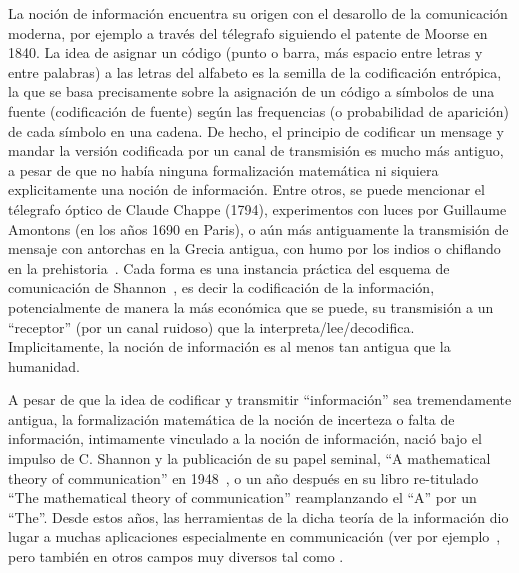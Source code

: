 \label{s:SZ:Introduccion}

La  noci\'on  de  informaci\'on encuentra  su  origen  con  el desarollo  de  la
comunicaci\'on  moderna, por  ejemplo a  trav\'es del  t\'elegrafo  siguiendo el
patente de Moorse en 1840. La idea  de asignar un c\'odigo (punto o barra, m\'as
espacio entre letras  y entre palabras) a las letras del  alfabeto es la semilla
de  la  codificaci\'on  entr\'opica,  la  que  se  basa  precisamente  sobre  la
asignaci\'on  de un  c\'odigo  a  s\'imbolos de  una  fuente (codificaci\'on  de
fuente)  seg\'un  las  frequencias  (o  probabilidad  de  aparici\'on)  de  cada
s\'imbolo  en una  cadena.  De  hecho, el  principio de  codificar un  mensage y
mandar  la versi\'on codificada  por un  canal de  transmisi\'on es  mucho m\'as
antiguo,  a pesar  de que  no  hab\'ia ninguna  formalizaci\'on matem\'atica  ni
siquiera explicitamente  una noci\'on de  informaci\'on.  Entre otros,  se puede
mencionar  el t\'elegrafo  \'optico de  Claude Chappe  (1794),  experimentos con
luces  por Guillaume  Amontons (en  los  a\~nos 1690  en Paris),  o a\'un  m\'as
antiguamente la transmisi\'on de mensaje con antorchas en la Grecia antigua, con
humo por los  indios o chiflando en la  prehistoria~\cite{Mon08}.  Cada forma es
una instancia  pr\'actica del esquema de  comunicaci\'on de Shannon~\cite{Sha48,
ShaWea64},  es decir la  codificaci\'on de  la informaci\'on,  potencialmente de
manera la  m\'as econ\'omica  que se puede,  su transmisi\'on a  un ``receptor''
(por  un canal  ruidoso) que  la interpreta/lee/decodifica.   Implicitamente, la
noci\'on de informaci\'on es al menos tan antigua que la humanidad.

A  pesar  de  que  la  idea  de codificar  y  transmitir  ``informaci\'on''  sea
tremendamente  antigua,  la  formalizaci\'on  matem\'atica  de  la  noci\'on  de
incerteza  o falta  de informaci\'on,  intimamente  vinculado a  la noci\'on  de
informaci\'on, naci\'o bajo  el impulso de C.  Shannon y  la publicaci\'on de su
papel seminal, ``A mathematical  theory of communication'' en 1948~\cite{Sha48},
o  un a\~no  despu\'es  en su  libro  re-titulado ``The  mathematical theory  of
communication'' reamplanzando el  ``A'' por un ``The''. Desde  estos a\~nos, las
herramientas  de  la  dicha  teor\'ia  de  la informaci\'on  dio  lugar  a  muchas
aplicaciones   especialmente  en   communicaci\'on   (ver  por   ejemplo~\cite[y
ref.]{CovTho06, Ver98, Gal01},  pero tambi\'en en otros campos  muy diversos tal
como   .

